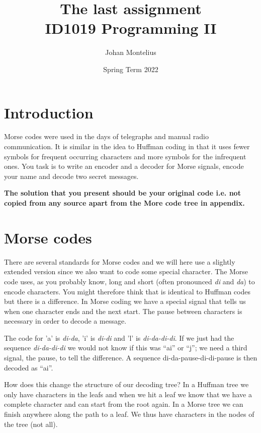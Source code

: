 \documentclass[a4paper,11pt]{article}
\begin{document}
\title{
    \textbf{The last assignment}\\
    \large{ID1019 Programming II}
}
\author{Johan Montelius}
\date{Spring Term 2022}
\maketitle
{}


\section*{Introduction}

Morse codes were used in the days of telegraphs and manual radio
communication. It is similar in the idea to Huffman coding in that it
uses fewer symbols for frequent occurring characters and more symbols
for the infrequent ones. You task is to write an encoder and a decoder
for Morse signals, encode your name and decode two secret messages.

{\bf The solution that you present should be your original code i.e. not
  copied from any source apart from the More code tree in appendix. }

\section{Morse codes}

There are several standards for Morse codes and we will here use a
slightly extended version since we also want to code some special
character. The Morse code uses, as you probably know, long and short
(often pronounced {\em di} and {\em da}) to encode characters. You
might therefore think that is identical to Huffman codes but there is
a difference. In Morse coding we have a special signal that tells us
when one character ends and the next start. The pause between
characters is necessary in order to decode a message.

The code for 'a' is {\em di-da}, 'i' is {\em di-di} and 'l' is {\em di-da-di-di}.  If
we just had the sequence {\em di-da-di-di} we would not know if this
was ``ai'' or ``j''; we need a third signal, the pause, to tell the
difference. A sequence {di-da-pause-di-di-pause} is then decoded as ``ai''.

How does this change the structure of our decoding tree? In a Huffman
tree we only have characters in the leafs and when we hit a leaf we
know that we have a complete character and can start from the root
again. In a Morse tree we can finish anywhere along the path to a
leaf. We thus have characters in the nodes of the tree (not all).
\end{document}
